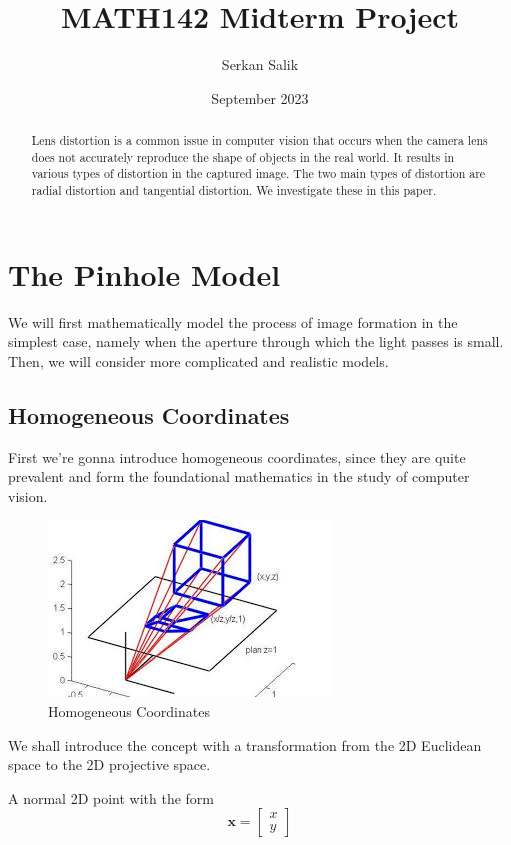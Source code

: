 \documentclass{article}
\title{MATH142 Midterm Project}
\author{Serkan Salik}
\date{September 2023}
\begin{document}
\maketitle

\begin{abstract}
    Lens distortion is a common issue in computer vision that occurs when the camera lens does not accurately reproduce the shape of objects in the real world. It results in various types of distortion in the captured image. The two main types of distortion are radial distortion and tangential distortion. We investigate these in this paper.
\end{abstract}

\section{The Pinhole Model}

We will first mathematically model the process of image formation in the simplest case, namely when the aperture through which the light passes is small. Then, we will consider more complicated and realistic models. 

\subsection{Homogeneous Coordinates}

First we're gonna introduce homogeneous coordinates, since they are quite prevalent and form the foundational mathematics in the study of computer vision. 

\begin{figure}[h]
    \centering
    \includegraphics[scale=0.65]{pp.jpeg}
    \caption{Homogeneous Coordinates}
    \label{k}
\end{figure}

We shall introduce the concept with a transformation from the 2D Euclidean space to the 2D projective space.

A normal 2D point with the form
\[\mathbf{x} = \begin{bmatrix}
    x \\ y
\end{bmatrix}\]
\end{document}
